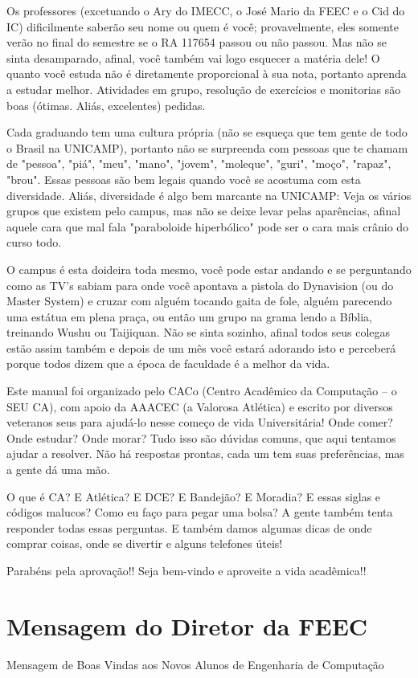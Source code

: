 Os professores (excetuando o Ary do IMECC, o José Mario da FEEC e o Cid do IC)
dificilmente saberão seu nome ou quem é você; provavelmente, eles somente verão
no final do semestre se o RA 117654  passou ou não passou. Mas não se sinta
desamparado, afinal, você também vai logo esquecer a matéria dele! O quanto você
estuda não é diretamente proporcional à sua nota, portanto aprenda a estudar
melhor. Atividades em grupo, resolução de exercícios e monitorias são boas
(ótimas. Aliás, excelentes) pedidas.

Cada graduando tem uma cultura própria (não se esqueça que tem gente de todo
o Brasil na UNICAMP), portanto não se surpreenda com pessoas que te chamam de
"pessoa", "piá", "meu", "mano", "jovem", "moleque", "guri", "moço", "rapaz",
"brou". Essas pessoas são bem legais quando você se acostuma com esta
diversidade. Aliás, diversidade é algo bem marcante na UNICAMP: Veja os vários
grupos que existem pelo campus, mas não se deixe levar pelas aparências, afinal
aquele cara que mal fala "paraboloide hiperbólico" pode ser o cara mais crânio
do curso todo.

O campus é esta doideira toda mesmo, você pode estar andando e se perguntando
como as TV's sabiam para onde você apontava a pistola do Dynavision (ou do
Master System) e cruzar com alguém tocando gaita de fole, alguém parecendo uma
estátua em plena praça, ou então um grupo na grama lendo a Bíblia, treinando
Wushu ou Taijiquan. Não se sinta sozinho, afinal todos seus colegas estão assim
também e depois de um mês você estará adorando isto e perceberá porque todos
dizem que a época de faculdade é a melhor da vida.

Este manual foi organizado pelo CACo (Centro Acadêmico da Computação -- o SEU
CA), com apoio da AAACEC (a Valorosa Atlética) e escrito por diversos veteranos
seus para ajudá-lo nesse começo de vida Universitária! Onde comer? Onde estudar?
Onde morar? Tudo isso são dúvidas comuns, que aqui tentamos ajudar a resolver.
Não há respostas prontas, cada um tem suas preferências, mas a gente dá uma mão.

O que é CA? E Atlética? E DCE? E Bandejão? E Moradia? E essas siglas e códigos
malucos? Como eu faço para pegar uma bolsa? A gente também tenta responder todas
essas perguntas. E também damos algumas dicas de onde comprar coisas, onde se
divertir e alguns telefones úteis!

Parabéns pela aprovação!! Seja bem-vindo e aproveite a vida acadêmica!!

\section{Mensagem do Diretor da FEEC}
Mensagem de Boas Vindas aos Novos Alunos de Engenharia de Computação

